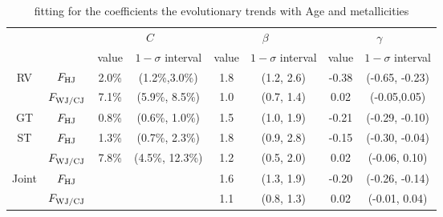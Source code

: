 \documentclass[twocolumn]{pnas-new}
\begin{document}
\begin{table*}[!t]
\renewcommand\arraystretch{1.2}
\centering
\caption{fitting for the coefficients the evolutionary trends with Age and metallicities}
{\footnotesize
\label{tab:fittingparamodel}
\begin{tabular}{cc|cc|cc|cc} \hline
    &   &  \multicolumn{2}{c}{$C$}   &  \multicolumn{2}{c}{$\beta$} & \multicolumn{2}{c}{$\gamma$}\\
 &  & value  & $1-\sigma$ interval  & value  & $1-\sigma$ interval & value  & $1-\sigma$ interval \\ \hline
 \multirow{2}{*}{RV} & $F_{\rm HJ}$ & 2.0\% & (1.2\%,3.0\%) & 1.8 & (1.2, 2.6) & -0.38 & (-0.65, -0.23) \\
 & $F_{\rm WJ/CJ}$ 
   & 7.1\% & (5.9\%, 8.5\%) & 1.0 & (0.7, 1.4) & 0.02 & (-0.05,0.05)  \\
     \hline
  GT & $F_{\rm HJ}$ & 0.8\% & (0.6\%, 1.0\%) & 1.5 & (1.0, 1.9) & -0.21 & (-0.29, -0.10)   \\ \hline
  
  \multirow{2}{*}{ST} & $F_{\rm HJ}$ & 1.3\% & (0.7\%, 2.3\%) & 1.8 & (0.9, 2.8) & -0.15 & (-0.30, -0.04)\\
 & $F_{\rm WJ/CJ}$  & 7.8\% & (4.5\%, 12.3\%) & 1.2 & (0.5, 2.0) & 0.02 & (-0.06, 0.10)\\ \hline

 \multirow{2}{*}{Joint} & $F_{\rm HJ}$ &  & & 1.6 & (1.3, 1.9) & -0.20 & (-0.26, -0.14)\\
 & $F_{\rm WJ/CJ}$  &  &  & 1.1 & (0.8, 1.3) & 0.02 & (-0.01, 0.04)\\ \hline
\end{tabular}}
\end{table*}
\end{document}

